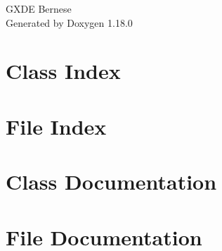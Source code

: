 \documentclass[twoside]{book}
\newcommand{\+}{\discretionary{\mbox{\scriptsize$\hookleftarrow$}}{}{}}
\newcommand{\clearemptydoublepage}{%
    \newpage{\pagestyle{empty}\cleardoublepage}%
  }
\begin{document}
  \raggedbottom
    \hypersetup{pageanchor=false,
                bookmarksnumbered=true,
                pdfencoding=unicode
               }
  \begin{titlepage}
  \vspace*{7cm}
  \begin{center}%
  {\Large GXDE Bernese}\\
  \vspace*{1cm}
  {\large Generated by Doxygen 1.18.0}\\
  \end{center}
  \end{titlepage}
  \clearemptydoublepage
  \tableofcontents
  \clearemptydoublepage
  \hypersetup{pageanchor=true}

\chapter{Class Index}

\chapter{File Index}

\chapter{Class Documentation}









\chapter{File Documentation}
















  \backmatter
  \newpage
  \clearemptydoublepage
  \printindex
\end{document}
